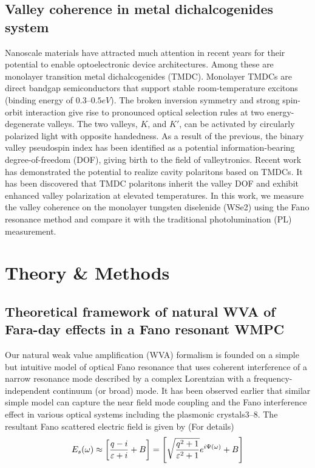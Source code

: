 \documentclass[13pt]{article}
\begin{document}
	\subsection{Valley coherence in metal dichalcogenides system}
	\noindent
	\par 
	Nanoscale materials have attracted much attention in recent years for their potential to enable optoelectronic device architectures. Among these are monolayer transition metal dichalcogenides (TMDC)\cite{1.valley, 2.valley}. Monolayer TMDCs are direct bandgap semiconductors that support stable room-temperature excitons (binding energy of $0.3–0.5 eV$). The broken inversion symmetry and strong spin-orbit interaction give rise to pronounced optical selection rules at two energy-degenerate valleys. The two valleys, $K$, and $K'$, can be activated by circularly polarized light with opposite handedness. As a result of the previous, the binary valley pseudospin index has been identified as a potential information-bearing degree-of-freedom (DOF), giving birth to the field of valleytronics. Recent work has demonstrated the potential to realize cavity polaritons based on TMDCs. It has been discovered that TMDC polaritons inherit the valley DOF and exhibit enhanced valley polarization at elevated temperatures. In this work, we measure the valley coherence on the monolayer tungsten diselenide (WSe2) using the Fano resonance method and compare it with the traditional photolumination (PL) measurement.
	
	
	\section{Theory \& Methods}
	\subsection{ Theoretical framework of natural WVA of Fara-day effects in a Fano resonant WMPC}
	\noindent
	\par
	Our natural weak value amplification (WVA) formalism is founded on a simple but intuitive model of optical Fano resonance that uses coherent interference of a narrow resonance mode described by a complex Lorentzian with a frequency-independent continuum (or broad) mode. It has been  observed earlier that similar simple model can capture the near field mode coupling and the Fano interference  effect  in  various  optical  systems including  the  plasmonic  crystals3–8.  The  resultant Fano scattered electric field is given by (For details\cite{1.paper})
	\begin{equation}
		\centering
		E_s(\omega) \approx \left[ \frac{q - i}{\varepsilon + i} +B \right] = \left[ \sqrt{\frac{q^2 +1}{\varepsilon^2 +1}} e^{i\Psi(\omega)} +B\right]
		\label{eqs:WVA Electric field}
	\end{equation}
	
\end{document}
